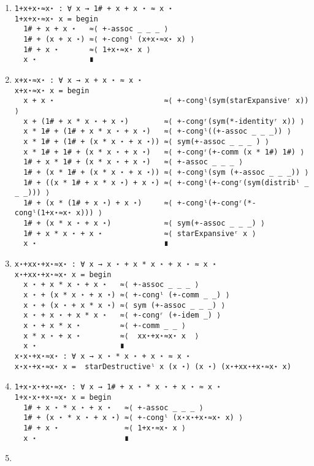 \begin{enumerate}
\begin{verbatim}
\end{verbatim}
\item
\begin{verbatim}
1+x+x⋆≈x⋆ : ∀ x → 1# + x + x ⋆ ≈ x ⋆
1+x+x⋆≈x⋆ x = begin
  1# + x + x ⋆   ≈⟨ +-assoc _ _ _ ⟩ 
  1# + (x + x ⋆) ≈⟨ +-congˡ (x+x⋆≈x⋆ x) ⟩ 
  1# + x ⋆       ≈⟨ 1+x⋆≈x⋆ x ⟩ 
  x ⋆            ∎
\end{verbatim}
\item
\begin{verbatim}
x+x⋆≈x⋆ : ∀ x → x + x ⋆ ≈ x ⋆
x+x⋆≈x⋆ x = begin
  x + x ⋆                         ≈⟨ +-congˡ(sym(starExpansiveʳ x)) ⟩
  x + (1# + x * x ⋆ + x ⋆)        ≈⟨ +-congʳ(sym(*-identityʳ x)) ⟩ 
  x * 1# + (1# + x * x ⋆ + x ⋆)   ≈⟨ +-congˡ((+-assoc _ _ _)) ⟩ 
  x * 1# + (1# + (x * x ⋆ + x ⋆)) ≈⟨ sym(+-assoc _ _ _ ) ⟩ 
  x * 1# + 1# + (x * x ⋆ + x ⋆)   ≈⟨ +-congʳ(+-comm (x * 1#) 1#) ⟩ 
  1# + x * 1# + (x * x ⋆ + x ⋆)   ≈⟨ +-assoc _ _ _ ⟩ 
  1# + (x * 1# + (x * x ⋆ + x ⋆)) ≈⟨ +-congˡ(sym (+-assoc _ _ _)) ⟩ 
  1# + ((x * 1# + x * x ⋆) + x ⋆) ≈⟨ +-congˡ(+-congʳ(sym(distribˡ _ _ _))) ⟩ 
  1# + (x * (1# + x ⋆) + x ⋆)     ≈⟨ +-congˡ(+-congʳ(*-congˡ(1+x⋆≈x⋆ x))) ⟩ 
  1# + (x * x ⋆ + x ⋆)            ≈⟨ sym(+-assoc _ _ _) ⟩ 
  1# + x * x ⋆ + x ⋆              ≈⟨ starExpansiveʳ x ⟩ 
  x ⋆                             ∎
\end{verbatim}
\item
\begin{verbatim}
x⋆+xx⋆+x⋆≈x⋆ : ∀ x → x ⋆ + x * x ⋆ + x ⋆ ≈ x ⋆
x⋆+xx⋆+x⋆≈x⋆ x = begin
  x ⋆ + x * x ⋆ + x ⋆   ≈⟨ +-assoc _ _ _ ⟩ 
  x ⋆ + (x * x ⋆ + x ⋆) ≈⟨ +-congˡ (+-comm _ _) ⟩
  x ⋆ + (x ⋆ + x * x ⋆) ≈⟨ sym (+-assoc _ _ _) ⟩ 
  x ⋆ + x ⋆ + x * x ⋆   ≈⟨ +-congʳ (+-idem _) ⟩ 
  x ⋆ + x * x ⋆         ≈⟨ +-comm _ _ ⟩
  x * x ⋆ + x ⋆         ≈⟨  xx⋆+x⋆≈x⋆ x  ⟩ 
  x ⋆                   ∎
x⋆x⋆+x⋆≈x⋆ : ∀ x → x ⋆ * x ⋆ + x ⋆ ≈ x ⋆
x⋆x⋆+x⋆≈x⋆ x =  starDestructiveˡ x (x ⋆) (x ⋆) (x⋆+xx⋆+x⋆≈x⋆ x) 
\end{verbatim}
\item
\begin{verbatim}
1+x⋆x⋆+x⋆≈x⋆ : ∀ x → 1# + x ⋆ * x ⋆ + x ⋆ ≈ x ⋆
1+x⋆x⋆+x⋆≈x⋆ x = begin
  1# + x ⋆ * x ⋆ + x ⋆   ≈⟨ +-assoc _ _ _ ⟩ 
  1# + (x ⋆ * x ⋆ + x ⋆) ≈⟨ +-congˡ (x⋆x⋆+x⋆≈x⋆ x) ⟩
  1# + x ⋆               ≈⟨ 1+x⋆≈x⋆ x ⟩
  x ⋆                    ∎
\end{verbatim}
\item
\begin{verbatim}

\end{verbatim}
\end{enumerate}
